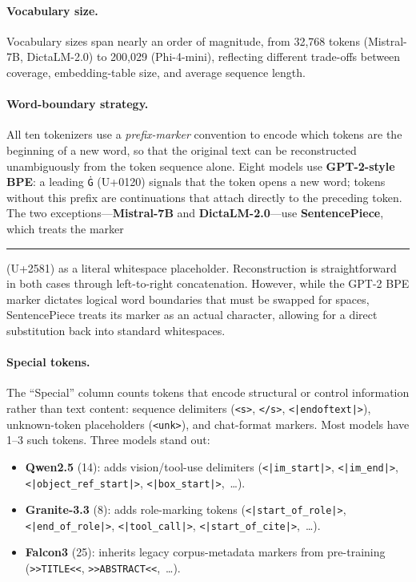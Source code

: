 \documentclass[11pt, a4paper]{article}
\newcommand{\spmark}{\rule[0.18ex]{0.65em}{0.11ex}}
\begin{document}
\paragraph{Vocabulary size.}
Vocabulary sizes span nearly an order of magnitude, from 32,768 tokens
(Mistral-7B, DictaLM-2.0) to 200,029 (Phi-4-mini), reflecting different
trade-offs between coverage, embedding-table size, and average sequence length.

\paragraph{Word-boundary strategy.}
All ten tokenizers use a \emph{prefix-marker} convention to encode which tokens
are the beginning of a new word, so that the original text can be reconstructed
unambiguously from the token sequence alone.  Eight models use
\textbf{GPT-2-style BPE}: a leading \texttt{Ġ} (U+0120) signals that the token
opens a new word; tokens without this prefix are continuations that attach
directly to the preceding token.  The two exceptions---\textbf{Mistral-7B} and
\textbf{DictaLM-2.0}---use \textbf{SentencePiece}, which treats the marker  \spmark{(U+2581)} as a literal whitespace placeholder. Reconstruction is straightforward in both cases through left-to-right concatenation. However, while the GPT-2 BPE marker dictates logical word boundaries that must be swapped for spaces, SentencePiece treats its marker as an actual character, allowing for a direct substitution back into standard whitespaces. 

\paragraph{Special tokens.}
The ``Special'' column counts tokens that encode structural or control
information rather than text content: sequence delimiters (\texttt{<s>},
\texttt{</s>}, \texttt{<|endoftext|>}), unknown-token placeholders
(\texttt{<unk>}), and chat-format markers.  Most models have 1--3 such tokens.
Three models stand out:
\begin{itemize}[noitemsep]
  \item \textbf{Qwen2.5} (14): adds vision/tool-use delimiters
        (\texttt{<|im\_start|>}, \texttt{<|im\_end|>},
        \texttt{<|object\_ref\_start|>}, \texttt{<|box\_start|>},~\ldots).
  \item \textbf{Granite-3.3} (8): adds role-marking tokens
        (\texttt{<|start\_of\_role|>}, \texttt{<|end\_of\_role|>},
        \texttt{<|tool\_call|>}, \texttt{<|start\_of\_cite|>},~\ldots).
  \item \textbf{Falcon3} (25): inherits legacy corpus-metadata markers from
        pre-training (\texttt{>>TITLE<<}, \texttt{>>ABSTRACT<<},~\ldots).
\end{itemize}
\end{document}

